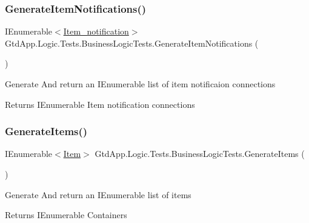 \subsubsection{\texorpdfstring{Generate\+Item\+Notifications()}{GenerateItemNotifications()}}
{\footnotesize\ttfamily I\+Enumerable$<$\mbox{\hyperlink{class_gtd_app_1_1_data_1_1_item__notification}{Item\+\_\+notification}}$>$ Gtd\+App.\+Logic.\+Tests.\+Business\+Logic\+Tests.\+Generate\+Item\+Notifications (\begin{DoxyParamCaption}{ }\end{DoxyParamCaption})\hspace{0.3cm}{\ttfamily [private]}}



Generate And return an I\+Enumerable list of item notificaion connections 

\begin{DoxyReturn}{Returns}
I\+Enumerable Item notification connections
\end{DoxyReturn}
\mbox{\label{class_gtd_app_1_1_logic_1_1_tests_1_1_business_logic_tests_a05753cb7df89cdae2dd2a126db5e4c4d}} 
\subsubsection{\texorpdfstring{Generate\+Items()}{GenerateItems()}}
{\footnotesize\ttfamily I\+Enumerable$<$\mbox{\hyperlink{class_gtd_app_1_1_data_1_1_item}{Item}}$>$ Gtd\+App.\+Logic.\+Tests.\+Business\+Logic\+Tests.\+Generate\+Items (\begin{DoxyParamCaption}{ }\end{DoxyParamCaption})\hspace{0.3cm}{\ttfamily [private]}}



Generate And return an I\+Enumerable list of items 

\begin{DoxyReturn}{Returns}
I\+Enumerable Containers
\end{DoxyReturn}
\mbox{\label{class_gtd_app_1_1_logic_1_1_tests_1_1_business_logic_tests_aa0d7989e760f0bbfddda800d4f7ac725}} 
